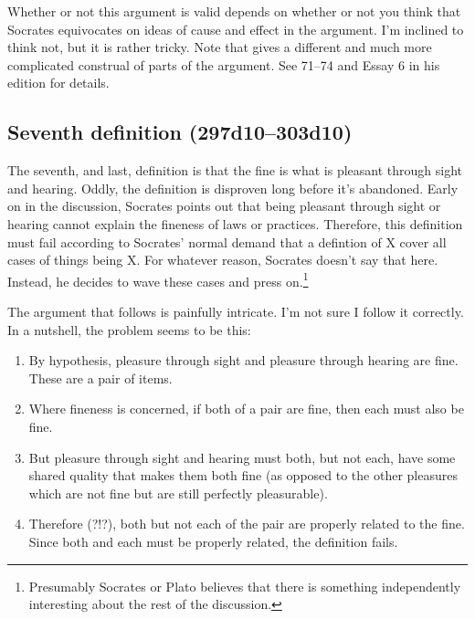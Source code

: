 \documentclass[11pt]{article}
\begin{document}
Whether or not this argument is valid depends on whether or not you think that
Socrates equivocates on ideas of cause and effect in the argument.  I'm
inclined to think not, but it is rather tricky.  Note that \citet{woodruff1982}
gives a different and much more complicated construal of parts of the argument.
See 71--74 and Essay {6} in his edition for details.


\subsection{Seventh definition (297d10--303d10)}

The seventh, and last, definition is that the fine is what is pleasant through
sight and hearing.  Oddly, the definition is disproven long before it's
abandoned.  Early on in the discussion, Socrates points out that being pleasant
through sight or hearing cannot explain the fineness of laws or practices.
Therefore, this definition must fail according to Socrates' normal demand that
a defintion of X cover all cases of things being X.  For whatever reason,
Socrates doesn't say that here.  Instead, he decides to wave these cases and
press on.\footnote{Presumably Socrates or Plato believes that there is
something independently interesting about the rest of the discussion.}

The argument that follows is painfully intricate.  I'm not sure I follow it
correctly.  In a nutshell, the problem seems to be this:

\begin{enumerate}

    \item By hypothesis, pleasure through sight and pleasure through hearing
        are fine.  These are a pair of items.

    \item Where fineness is concerned, if both of a pair are fine, then each
        must also be fine.

    \item But pleasure through sight and hearing must both, but not each, have
        some shared quality that makes them both fine (as opposed to the other
        pleasures which are not fine but are still perfectly pleasurable).

    \item Therefore (?!?), both but not each of the pair are properly related
        to the fine.  Since both and each must be properly related, the
        definition fails.

\end{enumerate}
\end{document}
